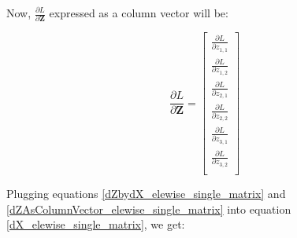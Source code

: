\documentclass{article}
\newcommand{\matr}[1]{\mathbf{#1}} %
\begin{document}
Now, $\frac{\partial L}{\partial \matr{Z}}$ expressed as a column vector will be:

\begin{equation} \label{dZAsColumnVector_elewise_single_matrix}
\frac{\partial L}{\partial \matr{Z}} =
\begin{bmatrix}
\frac{\partial L}{\partial z_{1,1}} \\[0.7em]
\frac{\partial L}{\partial z_{1,2}} \\[0.7em]
\frac{\partial L}{\partial z_{2,1}} \\[0.7em]
\frac{\partial L}{\partial z_{2,2}} \\[0.7em]
\frac{\partial L}{\partial z_{3,1}} \\[0.7em]
\frac{\partial L}{\partial z_{3,2}} \\[0.7em]
\end{bmatrix}
\end{equation}


Plugging equations \ref{dZbydX_elewise_single_matrix} and \ref{dZAsColumnVector_elewise_single_matrix} into equation \ref{dX_elewise_single_matrix}, we get:
\end{document}
